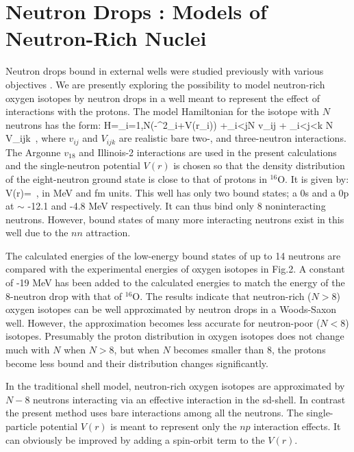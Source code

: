 \section{Neutron Drops : Models of Neutron-Rich Nuclei}

Neutron drops bound in external wells were studied previously with various 
objectives \cite{ndrop1,ndrop2,ndrop3}.  We are presently exploring the 
possibility to model neutron-rich oxygen isotopes by neutron drops in a 
well meant to represent the effect of interactions with the protons.  The 
model Hamiltonian for the isotope with $N$ neutrons has the form:
\beq
H=\sum_{i=1,N}\left(-\nabla^2_i+V(r_i)\right) 
  +\sum_{i<j\leq N} v_{ij} + \sum_{i<j<k \leq N} V_{ijk}~,
\eeq
where $v_{ij}$ and $V_{ijk}$ are realistic bare two-, and three-neutron 
interactions.  The Argonne $v_{18}$ and Illinois-2 interactions are used 
in the present calculations and the single-neutron potential $V(r)$ is 
chosen so that the density distribution of the eight-neutron ground state 
is close to that of protons in $^{16}$O.  It is given by:
\beq
V(r)=~,
\eeq
in MeV and fm units.  This well has only two bound states; a 0s and a 0p 
at $\sim$ -12.1 and -4.8 MeV respectively.  It can thus bind only 8 noninteracting 
neutrons.  However, bound states of many more interacting neutrons exist in 
this well due to the $nn$ attraction. 

The calculated energies of the low-energy bound states of 
up to 14 neutrons are compared with the experimental energies of oxygen 
isotopes in Fig.2.  A constant of -19 MeV 
has been added to the calculated energies 
to match the energy of the 8-neutron drop with that of $^{16}$O. 
The results indicate that neutron-rich ($N > 8$) oxygen isotopes 
can be well approximated by neutron drops in a Woods-Saxon well.  
However, the approximation becomes less accurate for neutron-poor 
($N < 8$) isotopes.  Presumably the proton distribution in oxygen 
isotopes does not change much with $N$ when $N>8$, but when $N$ becomes 
smaller than 8, the protons become less bound and their distribution 
changes significantly. 

In the traditional shell model, neutron-rich oxygen isotopes are approximated 
by $N-8$ neutrons interacting via an effective interaction in the sd-shell. 
In contrast the present method uses bare interactions among all the neutrons.  
The single-particle 
potential $V(r)$ is meant to represent only the $np$ interaction 
effects.  It can obviously be improved by adding a spin-orbit term to the 
$V(r)$. 

